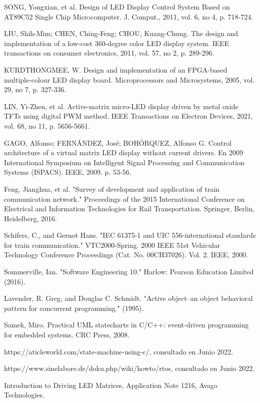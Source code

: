 \documentclass[conference]{IEEEtran}
\begin{document}
\begin{thebibliography}{00}
 SONG, Yongxian, et al. Design of LED Display Control System Based on AT89C52 Single Chip Microcomputer. J. Comput., 2011, vol. 6, no 4, p. 718-724.

 LIU, Shih-Mim; CHEN, Ching-Feng; CHOU, Kuang-Chung. The design and implementation of a low-cost 360-degree color LED display system. IEEE transactions on consumer electronics, 2011, vol. 57, no 2, p. 289-296.

 KURDTHONGMEE, W. Design and implementation of an FPGA-based multiple-colour LED display board. Microprocessors and Microsystems, 2005, vol. 29, no 7, p. 327-336.

 LIN, Yi-Zhen, et al. Active-matrix micro-LED display driven by metal oxide TFTs using digital PWM method. IEEE Transactions on Electron Devices, 2021, vol. 68, no 11, p. 5656-5661.

 GAGO, Alfonso; FERNÁNDEZ, José; BOHÓRQUEZ, Alfonso G. Control architecture of a virtual matrix LED display without current drivers. En 2009 International Symposium on Intelligent Signal Processing and Communication Systems (ISPACS). IEEE, 2009. p. 53-56.


 Feng, Jianghua, et al. "Survey of development and application of train communication network." Proceedings of the 2015 International Conference on Electrical and Information Technologies for Rail Transportation. Springer, Berlin, Heidelberg, 2016.

 Schifers, C., and Gernot Hans. "IEC 61375-1 and UIC 556-international standards for train communication." VTC2000-Spring. 2000 IEEE 51st Vehicular Technology Conference Proceedings (Cat. No. 00CH37026). Vol. 2. IEEE, 2000.

 Sommerville, Ian. "Software Engineering 10." Harlow: Pearson Education Limited (2016).

 Lavender, R. Greg, and Douglas C. Schmidt. "Active object--an object behavioral pattern for concurrent programming." (1995).

 Samek, Miro. Practical UML statecharts in C/C++: event-driven programming for embedded systems. CRC Press, 2008.

 https://aticleworld.com/state-machine-using-c/, consultado en Junio 2022.

 https://www.sinelabore.de/doku.php/wiki/howto/rtos, consultado en Junio 2022.

 Introduction to Driving LED Matrices, Application Note 1216, Avago Technologies.


\end{thebibliography}
\end{document}
